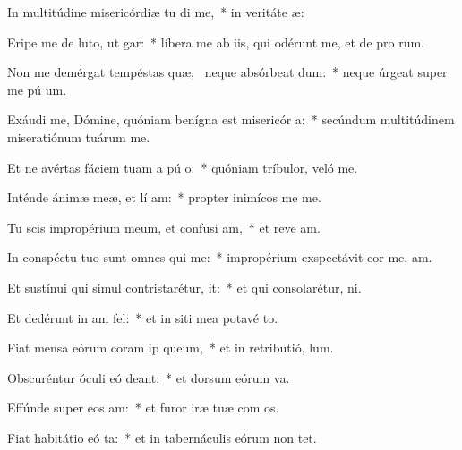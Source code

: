 \item In multitúdine misericórdiæ tu di me,~* in veritáte  æ:
\item Eripe me de luto, ut  gar:~* líbera me ab iis, qui odérunt me, et de pro rum.
\item Non me demérgat tempéstas quæ,~\pscross{} neque absórbeat  dum:~* neque úrgeat super me pú  um.
\item Exáudi me, Dómine, quóniam benígna est misericór a:~* secúndum multitúdinem miseratiónum tuárum   me.
\item Et ne avértas fáciem tuam a pú o:~* quóniam tríbulor, veló  me.
\item Inténde ánimæ meæ, et lí am:~* propter inimícos me  me.
\item Tu scis impropérium meum, et confusi am,~* et reve am.
\item In conspéctu tuo sunt omnes qui  me:~* impropérium exspectávit cor me,  am.
\item Et sustínui qui simul contristarétur,   it:~* et qui consolarétur,   ni.
\item Et dedérunt in  am fel:~* et in siti mea potavé  to.
\item Fiat mensa eórum coram ip  queum,~* et in retributió,   lum.
\item Obscuréntur óculi eó  deant:~* et dorsum eórum  va.
\item Effúnde super eos  am:~* et furor iræ tuæ com os.
\item Fiat habitátio eó ta:~* et in tabernáculis eórum non   tet.
